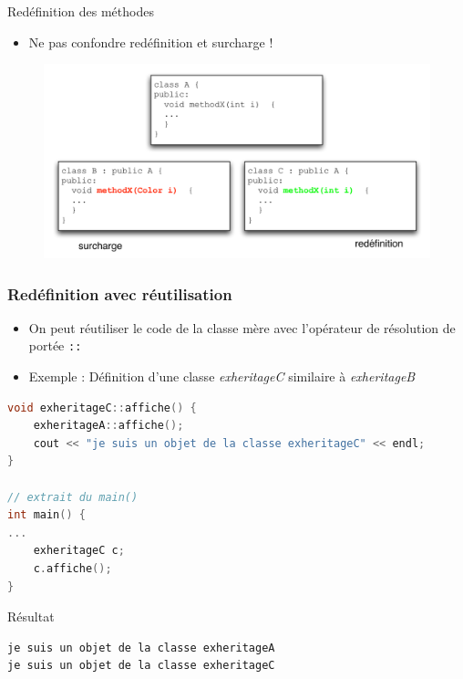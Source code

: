 %
%
\begin{frame}{Redéfinition des méthodes}
\begin{itemize}
	\item Ne pas confondre redéfinition et surcharge !
\end{itemize}
\begin{figure}[htbp]
    \begin{center}
      \includegraphics[scale=.45]{fig/rideload.pdf}
    \end{center}
  \end{figure}
\end{frame}
%
\begin{frame}[fragile]
\frametitle{{\href{code/heritageC.cxx}{}}  Redéfinition avec réutilisation}
\begin{itemize}
	\item On peut réutiliser le code de la classe mère avec l'opérateur de résolution de portée \texttt{::}
	\item Exemple : Définition d'une classe \textit{exheritageC} similaire à \textit{exheritageB}
\end{itemize}
\begin{lstlisting}[language=C++]
void exheritageC::affiche() {
    exheritageA::affiche();
    cout << "je suis un objet de la classe exheritageC" << endl;
}

// extrait du main()
int main() {
...
    exheritageC c;
    c.affiche();
}
\end{lstlisting}
\pause \begin{block}{Résultat}
{\tiny \begin{verbatim}
je suis un objet de la classe exheritageA
je suis un objet de la classe exheritageC
\end{verbatim}}
\end{block}
\end{frame}

